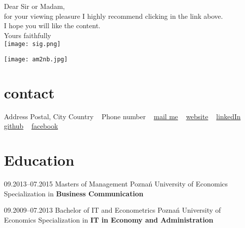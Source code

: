 \documentclass{arturmaciejaszek}
\begin{document}
\vspace{10pt}
 Dear Sir or Madam,\\    
\null\hspace{1cm} for your viewing pleasure I highly recommend clicking in the link above.\vspace{10pt}\\
\null\hspace{.8cm}I hope you will like the content.\vspace{10pt}\\
\null\hspace{.8cm}Yours faithfully\\
\null\hspace{1cm} \texttt{[image: sig.png]}

\begin{aside}
    \texttt{[image: am2nb.jpg]}
    \section{contact}
    Address
    Postal, City
    Country
    ~
    Phone number
    ~
    \href{mailto:EMAIL ADDRESS}{{\color{main} \faEnvelope} mail me}
    ~
    \href{http://www.arturmaciejaszek.com}{{\color{main}  \faGlobe} website}
    ~
    \href{https://www.linkedin.com/in/arturmaciejaszek/}{{\color{main}  \faLinkedin} linkedIn}
    ~
    \href{https://github.com/arturmaciejaszek}{{\color{main}  \faGithub} github}
    ~
    \href{http://facebook.com/artur.maciejaszek}{{\color{main} \faFacebook} facebook}
\end{aside}


\section{Education}

    \begin{entrylist}

        \edu
        {09.2013--07.2015}
        {{\normalfont Masters of} Management}
        {Poznań University of Economics}
        {\small{Specialization in} \normalsize\textbf{Business Communication}}
        
        \edu
        {09.2009--07.2013}
        {{\normalfont Bachelor of} IT and Econometrics}
        {Poznań University of Economics}
        {\small{Specialization in} \normalsize\textbf{IT in Economy and Administration}}
    \end{entrylist}
\end{document}
